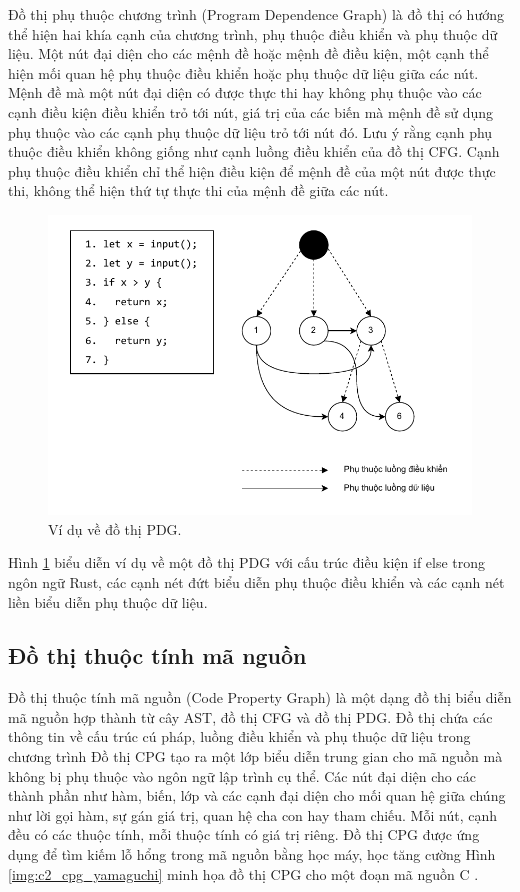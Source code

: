 Đồ thị phụ thuộc chương trình (Program Dependence Graph) \cite{ferrante1987program} là đồ thị có hướng thể hiện hai khía cạnh của chương trình, phụ thuộc điều khiển và phụ thuộc dữ liệu.
Một nút đại diện cho các mệnh đề hoặc mệnh đề điều kiện, một cạnh thể hiện mối quan hệ phụ thuộc điều khiển hoặc phụ thuộc dữ liệu giữa các nút.
Mệnh đề mà một nút đại diện có được thực thi hay không phụ thuộc vào các cạnh điều kiện điều khiển trỏ tới nút, giá trị của các biến mà mệnh đề sử dụng phụ thuộc vào các cạnh phụ thuộc dữ liệu trỏ tới nút đó.
Lưu ý rằng cạnh phụ thuộc điều khiển không giống như cạnh luồng điều khiển của đồ thị CFG.
Cạnh phụ thuộc điều khiển chỉ thể hiện điều kiện để mệnh đề của một nút được thực thi, không thể hiện thứ tự thực thi của mệnh đề giữa các nút.

\begin{figure}[H]
  \includegraphics[width=1\columnwidth]{figures/c2/c2_pdg_3.drawio.pdf}
  \centering
  \caption{Ví dụ về đồ thị PDG.}
  \label{img:c2_pdg}
\end{figure}

Hình \ref{img:c2_pdg} biểu diễn ví dụ về một đồ thị PDG với cấu trúc điều kiện if else trong ngôn ngữ Rust, các cạnh nét đứt biểu diễn phụ thuộc điều khiển và các cạnh nét liền biểu diễn phụ thuộc dữ liệu.

\subsection{Đồ thị thuộc tính mã nguồn}

Đồ thị thuộc tính mã nguồn (Code Property Graph) \cite{yamaguchi2014modeling} là một dạng đồ thị biểu diễn mã nguồn hợp thành từ cây AST, đồ thị CFG và đồ thị PDG.
Đồ thị chứa các thông tin về cấu trúc cú pháp, luồng điều khiển và phụ thuộc dữ liệu trong chương trình
Đồ thị CPG tạo ra một lớp biểu diễn trung gian cho mã nguồn mà không bị phụ thuộc vào ngôn ngữ lập trình cụ thể.
Các nút đại diện cho các thành phần như hàm, biến, lớp và các cạnh đại diện cho mối quan hệ giữa chúng như lời gọi hàm, sự gán giá trị, quan hệ cha con hay tham chiếu.
Mỗi nút, cạnh đều có các thuộc tính, mỗi thuộc tính có giá trị riêng.
Đồ thị CPG được ứng dụng để tìm kiếm lỗ hổng trong mã nguồn bằng học máy, học tăng cường \cite{zhou2019devign} %
Hình \ref{img:c2_cpg_yamaguchi} minh họa đồ thị CPG cho một đoạn mã nguồn C \cite{yamaguchi2014modeling}.

